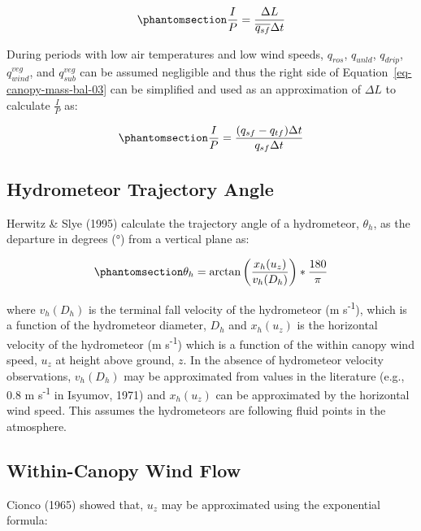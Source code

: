 \documentclass[
  letterpaper,
]{tex/uofsthesis-cs}
\begin{document}
\begin{equation}\phantomsection\label{eq-ip-L}{
\frac{I}{P} = \frac{\Delta L}{\overline{q_{sf}} \Delta t}
}\end{equation}

During periods with low air temperatures and low wind speeds,
\(q_{ros}\), \(q_{unld}\), \(q_{drip}\), \(q_{wind}^{veg}\), and
\(q_{sub}^{veg}\) can be assumed negligible and thus the right side of
Equation~\ref{eq-canopy-mass-bal-03} can be simplified and used as an
approximation of \(\Delta L\) to calculate \(\frac{I}{P}\) as:

\begin{equation}\phantomsection\label{eq-ip2}{
\frac{I}{P} = \frac{(q_{sf} - q_{tf})\Delta t}{q_{sf} \Delta t}
}\end{equation}

\subsection{Hydrometeor Trajectory
Angle}\label{hydrometeor-trajectory-angle}

Herwitz \& Slye (1995) calculate the trajectory angle of a hydrometeor,
\(\theta_h\), as the departure in degrees (°) from a vertical plane as:

\begin{equation}\phantomsection\label{eq-ta}{
\theta_h = \arctan \left(\frac{x_h(u_z)}{v_h(D_h)}\right)*\frac{180}{\pi}
}\end{equation}

where \(v_h(D_h)\) is the terminal fall velocity of the hydrometeor (m
s\textsuperscript{-1}), which is a function of the hydrometeor diameter,
\(D_h\) and \(x_h(u_z)\) is the horizontal velocity of the hydrometeor
(m s\textsuperscript{-1}) which is a function of the within canopy wind
speed, \(u_z\) at height above ground, \(z\). In the absence of
hydrometeor velocity observations, \(v_h(D_h)\) may be approximated from
values in the literature (e.g., 0.8 m s\textsuperscript{-1} in Isyumov,
1971) and \(x_h(u_z)\) can be approximated by the horizontal wind speed.
This assumes the hydrometeors are following fluid points in the
atmosphere.

\subsection{Within-Canopy Wind Flow}\label{within-canopy-wind-flow}

Cionco (1965) showed that, \(u_z\) may be approximated using the
exponential formula:
\end{document}
